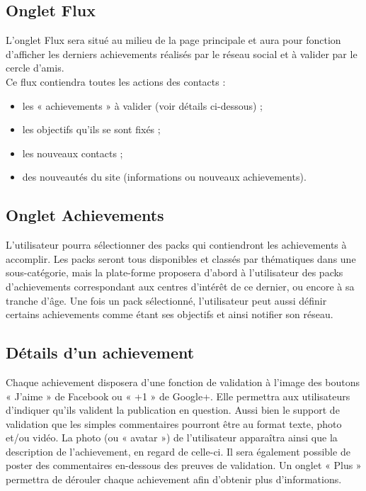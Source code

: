 \documentclass{life-fr}
\begin{document}
\subsection{Onglet Flux}

L'onglet Flux sera situé au milieu de la page principale et aura pour fonction d'afficher les derniers achievements réalisés par le réseau social et à valider par le cercle d'amis.\\

Ce flux contiendra toutes les actions des contacts :

\begin{itemize}
	\item les « achievements » à valider (voir détails ci-dessous) ;
	\item les objectifs qu'ils se sont fixés ;
	\item les nouveaux contacts ;
	\item des nouveautés du site (informations ou nouveaux achievements).
\end{itemize}

\newpage

\subsection{Onglet Achievements}

L'utilisateur pourra sélectionner des packs qui contiendront les achievements à accomplir. Les packs seront tous disponibles et classés par thématiques dans une sous-catégorie, mais la plate-forme proposera d'abord à l'utilisateur des packs d'achievements correspondant aux centres d'intérêt de ce dernier, ou encore à sa tranche d'âge. Une fois un pack sélectionné, l'utilisateur peut aussi définir certains achievements comme étant ses objectifs et ainsi notifier son réseau.

\subsection{Détails d'un achievement}

Chaque achievement disposera d'une fonction de validation à l'image des boutons « J'aime » de Facebook ou « +1 » de Google+. Elle permettra aux utilisateurs d'indiquer qu'ils valident la publication en question. Aussi bien le support de validation que les simples commentaires pourront être au format texte, photo et/ou vidéo. La photo (ou « avatar ») de l'utilisateur apparaîtra ainsi que la description de l'achievement, en regard de celle-ci. Il sera également possible de poster des commentaires en-dessous des preuves de validation. Un onglet « Plus » permettra de dérouler chaque achievement afin d'obtenir plus d'informations.\\
\end{document}
